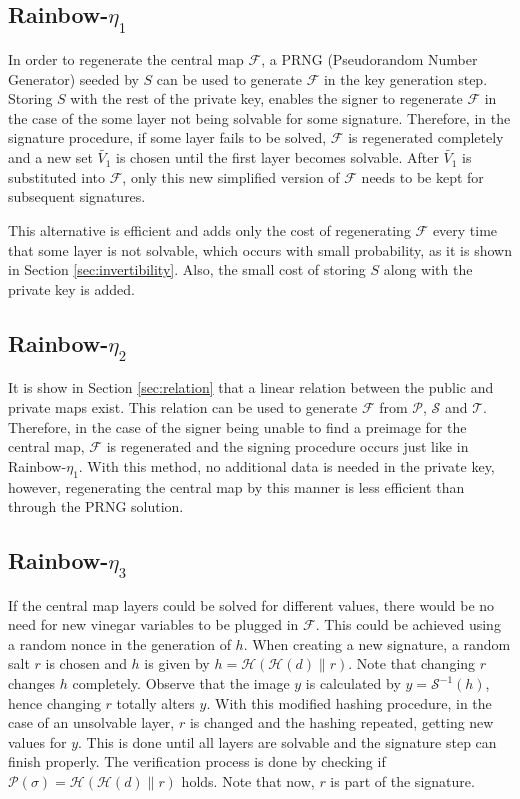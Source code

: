 \documentclass{ufsctex/ufsctex}
\begin{document}
\subsection{Rainbow-$\eta_1$}

In order to regenerate the central map $\mathcal{F}$, a
PRNG (Pseudorandom Number Generator)
seeded by $S$ can be used to generate $\mathcal{F}$ in the key generation step.
Storing $S$ with the rest of the private key, enables the signer to regenerate
$\mathcal{F}$ in the case of the some layer not being solvable for some
signature. Therefore, in the signature procedure, if some layer fails to be
solved, $\mathcal{F}$ is regenerated completely and a new set $\tilde{V_1}$ is
chosen until the first layer becomes solvable. After $\tilde{V_1}$ is
substituted into $\mathcal{F}$, only this new simplified version of
$\mathcal{F}$ needs to be kept for subsequent signatures.

This alternative is efficient and adds only the cost of regenerating
$\mathcal{F}$ every time that some layer is not solvable, which occurs with
small probability, as it is shown in Section \ref{sec:invertibility}. Also, the
small cost of storing $S$ along with the private key is added.

\subsection{Rainbow-$\eta_2$}

It is show in Section \ref{sec:relation} that a linear relation between the
public and private maps exist. This relation can be used to generate
$\mathcal{F}$ from $\mathcal{P}$, $\mathcal{S}$ and $\mathcal{T}$. Therefore,
in the case of the signer being unable to find a preimage for the central map,
$\mathcal{F}$ is regenerated and the signing procedure occurs just like in
Rainbow-$\eta_1$. With this method, no additional data is needed in the private
key, however, regenerating the central map by this manner is less efficient
than through the PRNG solution.

\subsection{Rainbow-$\eta_3$}\label{sec:rainboweta3}

If the central map layers could be solved for different values, there would be
no need for new vinegar variables to be plugged in $\mathcal{F}$. This could be
achieved using a random nonce in the generation of $h$. When creating a new
signature, a random salt $r$ is chosen and $h$ is given by $h =
\mathcal{H}(\mathcal{H}(d) \| r)$. Note that changing $r$ changes $h$
completely. Observe that the image $y$ is calculated by $y =
\mathcal{S}^{-1}(h)$, hence changing $r$ totally alters $y$. With this modified
hashing procedure, in the case of an unsolvable layer, $r$ is changed and the
hashing repeated, getting new values for $y$. This is done until all layers are
solvable and the signature step can finish properly. The verification process
is done by checking if $\mathcal{P}(\sigma) = \mathcal{H}(\mathcal{H}(d) \| r)$
holds. Note that now, $r$ is part of the signature.
\end{document}
